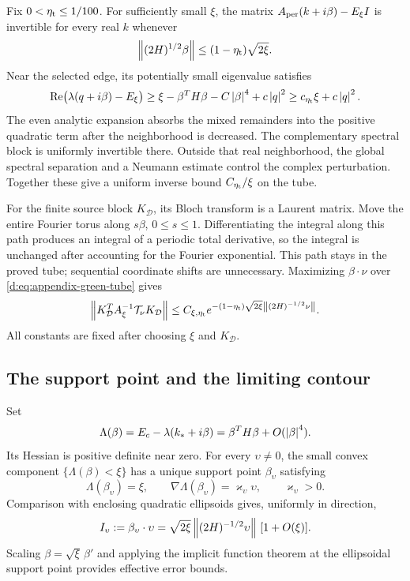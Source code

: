 Fix \(0<\eta_{\rm t}\le1/100\). For sufficiently small \(\xi\), the matrix
\(A_{\rm per}(k+i\beta)-E_\xi I\) is invertible for every real \(k\) whenever
\begin{equation}
 \left\lVert (2H)^{1/2}\beta\right\rVert
 \le(1-\eta_{\rm t})\sqrt{2\xi}.
 \label{d:eq:appendix-green-tube}
\end{equation}
Near the selected edge, its potentially small eigenvalue satisfies
\[
 \operatorname{Re}\bigl(\lambda(q+i\beta)-E_\xi\bigr)
 \ge\xi-\beta^TH\beta-C\left\lvert \beta\right\rvert^4+c\left\lvert q\right\rvert^2
 \ge c_{\eta_{\rm t}}\xi+c\left\lvert q\right\rvert^2.
\]
The even analytic expansion absorbs the mixed remainders into the
positive quadratic term after the neighborhood is decreased.
The complementary spectral block is uniformly invertible there.
Outside that real neighborhood, the global spectral separation and a
Neumann estimate control the complex perturbation. Together these give a
uniform inverse bound \(C_{\eta_{\rm t}}/\xi\) on the tube.

For the finite source block \(K_{\mathcal D}\), its Bloch transform is a Laurent matrix.
Move the entire Fourier torus along \(s\beta\), \(0\le s\le1\).
Differentiating the integral along this path produces an integral of a
periodic total derivative, so the integral is unchanged after accounting
for the Fourier exponential. This path stays in the proved tube;
sequential coordinate shifts are unnecessary. Maximizing
\(\beta\cdot\nu\) over \eqref{d:eq:appendix-green-tube} gives
\begin{equation}
 \left\lVert K_{\mathcal D}^TA_\xi^{-1}\mathcal T_\nu K_{\mathcal D}\right\rVert
 \le C_{\xi,\eta_{\rm t}}
 e^{-(1-\eta_{\rm t})\sqrt{2\xi}\left\lVert (2H)^{-1/2}\nu\right\rVert}.
 \label{d:eq:appendix-green-upper}
\end{equation}
All constants are fixed after choosing \(\xi\) and \(K_{\mathcal D}\).

\subsection{The support point and the limiting contour}

Set
\[
 \Lambda(\beta)=E_c-\lambda(k_*+i\beta)
 =\beta^TH\beta+O(\left\lvert \beta\right\rvert^4).
\]
Its Hessian is positive definite near zero. For every \(\upsilon\ne0\), the
small convex component \(\{\Lambda(\beta)<\xi\}\) has a unique support
point \(\beta_\upsilon\) satisfying
\[
 \Lambda(\beta_\upsilon)=\xi,\qquad
 \nabla\Lambda(\beta_\upsilon)=\varkappa_\upsilon\upsilon,\qquad \varkappa_\upsilon>0.
\]
Comparison with enclosing quadratic ellipsoids gives, uniformly in
direction,
\begin{equation}
 I_\upsilon:=\beta_\upsilon\cdot\upsilon
   =\sqrt{2\xi}\left\lVert (2H)^{-1/2}\upsilon\right\rVert\,[1+O(\xi)].
 \label{d:eq:appendix-support-rate}
\end{equation}
Scaling \(\beta=\sqrt{\xi}\,\beta'\) and applying the implicit function
theorem at the ellipsoidal support point provides effective error bounds.


